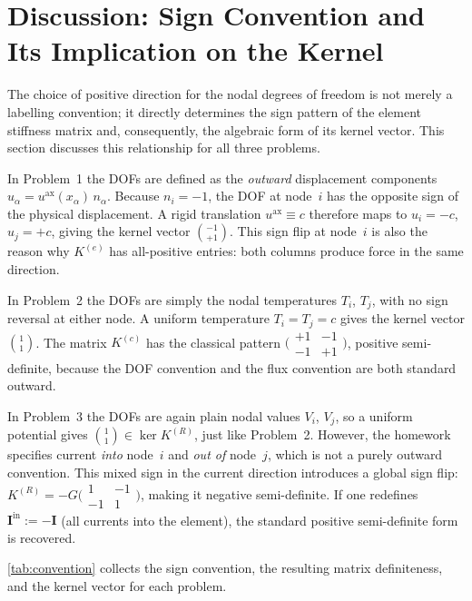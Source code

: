 \documentclass[11pt, a4paper]{article}
\begin{document}
\section{Discussion: Sign Convention and Its Implication on the Kernel}

The choice of positive direction for the nodal degrees of freedom is not merely a labelling convention; it directly determines the sign pattern of the element stiffness matrix and, consequently, the algebraic form of its kernel vector.  This section discusses this relationship for all three problems.

In Problem~1 the DOFs are defined as the \emph{outward} displacement components $u_\alpha=u^{\mathrm{ax}}(x_\alpha)\,n_\alpha$.  Because $n_i=-1$, the DOF at node~$i$ has the opposite sign of the physical displacement.  A rigid translation $u^{\mathrm{ax}}\equiv c$ therefore maps to $u_i=-c$, $u_j=+c$, giving the kernel vector $\binom{-1}{+1}$.  This sign flip at node~$i$ is also the reason why $K^{(e)}$ has all-positive entries: both columns produce force in the same direction.

In Problem~2 the DOFs are simply the nodal temperatures $T_i$, $T_j$, with no sign reversal at either node.  A uniform temperature $T_i=T_j=c$ gives the kernel vector $\binom{1}{1}$.  The matrix $K^{(c)}$ has the classical pattern $\bigl(\begin{smallmatrix}+1&-1\\-1&+1\end{smallmatrix}\bigr)$, positive semi-definite, because the DOF convention and the flux convention are both standard outward.

In Problem~3 the DOFs are again plain nodal values $V_i$, $V_j$, so a uniform potential gives $\binom{1}{1}\in\ker K^{(R)}$, just like Problem~2.  However, the homework specifies current \emph{into} node~$i$ and \emph{out of} node~$j$, which is not a purely outward convention.  This mixed sign in the current direction introduces a global sign flip: $K^{(R)}=-G\bigl(\begin{smallmatrix}1&-1\\-1&1\end{smallmatrix}\bigr)$, making it negative semi-definite.  If one redefines $\mathbf{I}^{\mathrm{in}}:=-\mathbf{I}$ (all currents into the element), the standard positive semi-definite form is recovered.

\cref{tab:convention} collects the sign convention, the resulting matrix definiteness, and the kernel vector for each problem.
\end{document}
